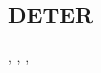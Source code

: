 \subsection{DETER}
\citep{DETER_Project}, \citep{DETER_benzel2011science}, \citep{DETER_mirkovic2010deter}, \citep{DETER_faber2007deter}
